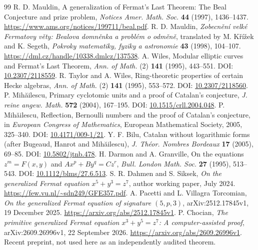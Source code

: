 \begin{thebibliography}{99}
 R. D. Mauldin, A generalization of Fermat's Last Theorem: The Beal Conjecture and prize problem, \emph{Notices Amer. Math. Soc.} \textbf{44} (1997), 1436--1437. \url{https://www.ams.org/notices/199711/beal.pdf}.
 R. D. Mauldin, \emph{Zobecn\v{e}n\'{i} velk\'{e} Fermatovy v\v{e}ty: Bealova domn\v{e}nka a probl\'{e}m o odm\v{e}n\v{e}}, translated by M. K\v{r}\'{i}\v{z}ek and K. Segeth, \emph{Pokroky matematiky, fyziky a astronomie} \textbf{43} (1998), 104--107. \url{https://dml.cz/handle/10338.dmlcz/137538}.
 A. Wiles, Modular elliptic curves and Fermat's Last Theorem, \emph{Ann. of Math.} (2) \textbf{141} (1995), 443--551. DOI: \href{https://doi.org/10.2307/2118559}{10.2307/2118559}.
 R. Taylor and A. Wiles, Ring-theoretic properties of certain Hecke algebras, \emph{Ann. of Math.} (2) \textbf{141} (1995), 553--572. DOI: \href{https://doi.org/10.2307/2118560}{10.2307/2118560}.
 P. Mih\u{a}ilescu, Primary cyclotomic units and a proof of Catalan's conjecture, \emph{J. reine angew. Math.} \textbf{572} (2004), 167--195. DOI: \href{https://doi.org/10.1515/crll.2004.048}{10.1515/crll.2004.048}.
 P. Mih\u{a}ilescu, Reflection, Bernoulli numbers and the proof of Catalan's conjecture, in \emph{European Congress of Mathematics}, European Mathematical Society, 2005, 325--340. DOI: \href{https://doi.org/10.4171/009-1/21}{10.4171/009-1/21}.
 Y. F. Bilu, Catalan without logarithmic forms (after Bugeaud, Hanrot and Mih\u{a}ilescu), \emph{J. Th\'{e}or. Nombres Bordeaux} \textbf{17} (2005), 69--85. DOI: \href{https://doi.org/10.5802/jtnb.478}{10.5802/jtnb.478}.
 H. Darmon and A. Granville, On the equations $z^m=F(x,y)$ and $Ax^p+By^q=Cz^r$, \emph{Bull. London Math. Soc.} \textbf{27} (1995), 513--543. DOI: \href{https://doi.org/10.1112/blms/27.6.513}{10.1112/blms/27.6.513}.
 S. R. Dahmen and S. Siksek, \emph{On the generalized Fermat equation $x^5+y^3=z^7$}, author working paper, July 2024. \url{https://few.vu.nl/~sdn249/GFE357.pdf}.
 A. Pacetti and L. Villagra Torcomian, \emph{On the generalized Fermat equation of signature $(5,p,3)$}, arXiv:2512.17845v1, 19 December 2025. \url{https://arxiv.org/abs/2512.17845v1}.
 P. Chocian, \emph{The primitive generalized Fermat equation $x^3+y^5=z^7$: A computer-assisted proof}, arXiv:2609.26996v1, 22 September 2026. \url{https://arxiv.org/abs/2609.26996v1}. Recent preprint, not used here as an independently audited theorem.

\end{thebibliography}
